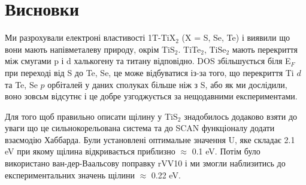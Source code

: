 \chapter*{Висновки}
Ми разрохували електроні властивості 1T-TiX$_2$ (X = S, Se, Te) і виявили що вони мають напівметалеву природу, окрім TiS$_2$. TiTe$_2$, TiSe$_2$ мають перекриття між смугами p і d халькогену та титану відповідно. DOS збільшується біля E$_F$ при переході від S до Te, Se, це може відбуватися із-за того, що перекриття Ti $d$ та Te, Se $p$ орбіталей у даних сполуках більше ніж з S, або як ми дослідили, воно зовсьм відсутнє і це добре узгоджується за нещодавними експериментами.

Для того щоб правильно описати щілину у TiS$_2$ знадобилось додаково взяти до уваги що це сильнокорельована система та до SCAN функціоналу додати взаємодію Хаббарда. Були установлені оптимальне значення U, яке складає 2.1 eV при якому щілина відкривається приблизно $\approx$ 0.1 eV. Потім було використано ван-дер-Ваальсову поправку rVV10 і ми змогли наблизитись до експериментальних значень щілини $\approx$ 0.22 eV. 